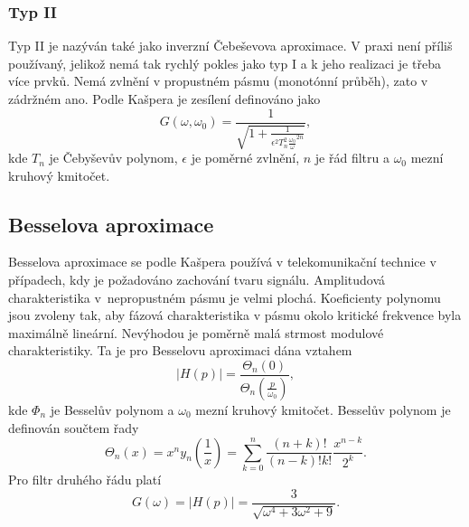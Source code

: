\subsubsection{Typ II}
Typ II je nazýván také jako inverzní Čebeševova aproximace. V praxi není příliš používaný, jelikož nemá tak rychlý pokles jako typ I a k jeho realizaci je třeba více prvků. Nemá zvlnění v propustném pásmu (monotónní průběh), zato v zádržném ano. Podle Kašpera \cite{7} je zesílení definováno jako
\begin{equation}
G(\omega, \omega _0) = \frac{1}{\sqrt{1 + \frac{1}{\epsilon ^2 T_n ^2 \frac{\omega _0}{\omega}^{2n}}}},
\end{equation}
kde $T_n$ je Čebyševův polynom, $\epsilon$ je poměrné zvlnění, $n$ je řád filtru a $\omega _0$ mezní kruhový kmitočet.
\subsection{Besselova aproximace}
Besselova aproximace se podle Kašpera \cite{7} používá v telekomunikační technice v případech, kdy je požadováno zachování tvaru signálu. Amplitudová charakteristika v~nepropustném pásmu je velmi plochá. Koeficienty polynomu jsou zvoleny tak, aby fázová charakteristika v pásmu okolo kritické frekvence byla maximálně lineární. Nevýhodou je poměrně malá strmost modulové charakteristiky. Ta je pro Besselovu aproximaci dána vztahem
\begin{equation}
|H(p)| = \frac{\Theta _n(0)}{\Theta _n(\frac{p}{\omega _0})},
\end{equation}
kde $\Phi _n$ je Besselův polynom a $\omega _0$ mezní kruhový kmitočet. Besselův polynom je definován součtem řady
\begin{equation}
\Theta _n (x) = x^n y_n (\frac{1}{x}) = \sum_{k=0}^{n}\frac{(n+k)!}{(n-k)!k!}\frac{x^{n-k}}{2^k}.
\end{equation}
Pro filtr druhého řádu platí
\begin{equation}
G(\omega) = |H(p)| = \frac{3}{\sqrt{\omega ^4 + 3\omega ^2 + 9}}.
\end{equation}
